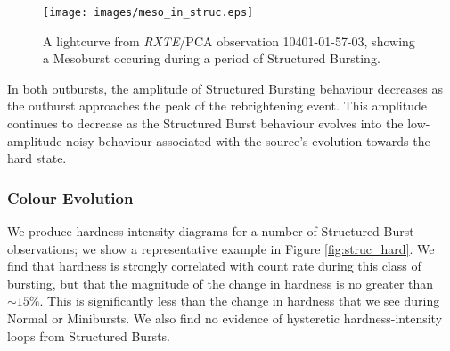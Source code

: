 \begin{figure}
  \centering
  \texttt{[image: images/meso\_in\_struc.eps]}
  \caption{\small A lightcurve from \textit{RXTE}/PCA observation 10401-01-57-03, showing a Mesoburst occuring during a period of Structured Bursting.}
  \label{fig:meso_in_struc}
\end{figure}

\par In both outbursts, the amplitude of Structured Bursting behaviour decreases as the outburst approaches the peak of the rebrightening event.  This amplitude continues to decrease as the Structured Burst behaviour evolves into the low-amplitude noisy behaviour associated with the source's evolution towards the hard state.

\subsubsection{Colour Evolution}

\par We produce hardness-intensity diagrams for a number of Structured Burst observations; we show a representative example in Figure \ref{fig:struc_hard}.  We find that hardness is strongly correlated with count rate during this class of bursting, but that the magnitude of the change in hardness is no greater than $\sim15\%$.  This is significantly less than the change in hardness that we see during Normal or Minibursts.  We also find no evidence of hysteretic hardness-intensity loops from Structured Bursts.

